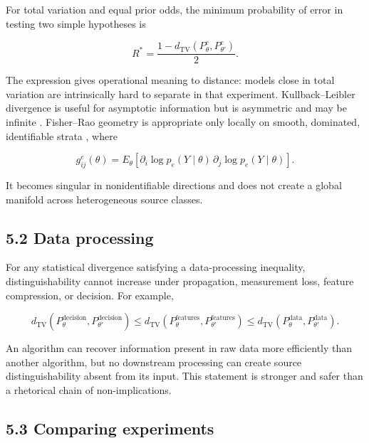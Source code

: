 \documentclass[11pt,a4paper]{article}
\begin{document}
For total variation and equal prior odds, the minimum probability of error in testing two simple hypotheses is

\begin{equation}
R^*=\frac{1-d_{\mathrm{TV}}(P^e_\theta,P^e_{\theta'})}{2}.
\end{equation}

The expression gives operational meaning to distance: models close in total variation are intrinsically hard to separate in that experiment. Kullback--Leibler divergence is useful for asymptotic information but is asymmetric and may be infinite \citep{kullbackleibler1951}. Fisher--Rao geometry is appropriate only locally on smooth, dominated, identifiable strata \citep{fisher1922,rao1945}, where

\begin{equation}
g^e_{ij}(\theta)=E_\theta\!\left[
\partial_i\log p_e(Y\mid\theta)\,
\partial_j\log p_e(Y\mid\theta)
\right].
\end{equation}

It becomes singular in nonidentifiable directions and does not create a global manifold across heterogeneous source classes.

\subsection{5.2 Data processing}\label{52-data-processing}

For any statistical divergence satisfying a data-processing inequality, distinguishability cannot increase under propagation, measurement loss, feature compression, or decision. For example,

\begin{equation}
d_{\mathrm{TV}}(P^{\mathrm{decision}}_\theta,
P^{\mathrm{decision}}_{\theta'})
\le d_{\mathrm{TV}}(P^{\mathrm{features}}_\theta,
P^{\mathrm{features}}_{\theta'})
\le d_{\mathrm{TV}}(P^{\mathrm{data}}_\theta,
P^{\mathrm{data}}_{\theta'}).
\end{equation}

An algorithm can recover information present in raw data more efficiently than another algorithm, but no downstream processing can create source distinguishability absent from its input. This statement is stronger and safer than a rhetorical chain of non-implications.

\subsection{5.3 Comparing experiments}\label{53-comparing-experiments}
\end{document}
